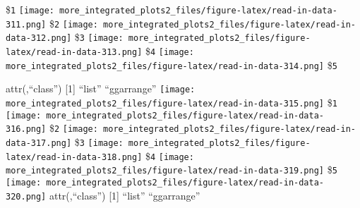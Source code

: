 \documentclass[
]{article}
\begin{document}
\$\texttt{1}
\texttt{[image: more\_integrated\_plots2\_files/figure-latex/read-in-data-311.png]}
\$\texttt{2}
\texttt{[image: more\_integrated\_plots2\_files/figure-latex/read-in-data-312.png]}
\$\texttt{3}
\texttt{[image: more\_integrated\_plots2\_files/figure-latex/read-in-data-313.png]}
\$\texttt{4}
\texttt{[image: more\_integrated\_plots2\_files/figure-latex/read-in-data-314.png]}
\$\texttt{5}

attr(,``class'') {[}1{]} ``list'' ``ggarrange''
\texttt{[image: more\_integrated\_plots2\_files/figure-latex/read-in-data-315.png]}
\$\texttt{1}
\texttt{[image: more\_integrated\_plots2\_files/figure-latex/read-in-data-316.png]}
\$\texttt{2}
\texttt{[image: more\_integrated\_plots2\_files/figure-latex/read-in-data-317.png]}
\$\texttt{3}
\texttt{[image: more\_integrated\_plots2\_files/figure-latex/read-in-data-318.png]}
\$\texttt{4}
\texttt{[image: more\_integrated\_plots2\_files/figure-latex/read-in-data-319.png]}
\$\texttt{5}
\texttt{[image: more\_integrated\_plots2\_files/figure-latex/read-in-data-320.png]}
attr(,``class'') {[}1{]} ``list'' ``ggarrange''

\pagebreak
\end{document}
